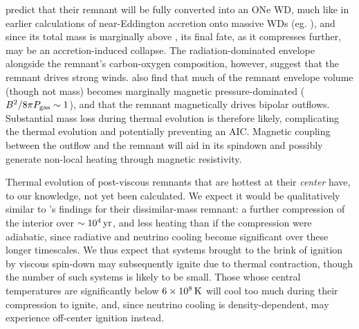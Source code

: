 \cite{shen+12} predict that their remnant will be fully converted into an ONe WD, much like in earlier calculations of near-Eddington accretion onto massive WDs (eg. \citeal{saion85}), and since its total mass is marginally above \Mch, its final fate, as it compresses further, may be an accretion-induced collapse.  The radiation-dominated envelope alongside the remnant's carbon-oxygen composition, however, suggest that the remnant drives strong winds.  \cite{ji+13} also find that much of the remnant envelope volume (though not mass) becomes marginally magnetic pressure-dominated ($B^2/8\pi P_\mathrm{gas} \sim 1$), and that the remnant magnetically drives bipolar outflows.  Substantial mass loss during thermal evolution is therefore likely, complicating the thermal evolution and potentially preventing an AIC.  Magnetic coupling between the outflow and the remnant will aid in its spindown and possibly generate non-local heating through magnetic resistivity.


Thermal evolution of post-viscous remnants that are hottest at their \textit{center} have, to our knowledge, not yet been calculated.  We expect it would be qualitatively similar to \cite{shen+12}'s findings for their dissimilar-mass remnant: a further compression of the interior over $\sim10^4\,\mathrm{yr}$, and less heating than if the compression were adiabatic, since radiative and neutrino cooling become significant over these longer timescales.  We thus expect that systems brought to the brink of ignition by viscous spin-down may subsequently ignite due to thermal contraction, though the number of such systems is likely to be small.  Those whose central temperatures are significantly below $6\times10^8\,\mathrm{K}$ will cool too much during their compression to ignite, and, since neutrino cooling is density-dependent, may experience off-center ignition instead.
